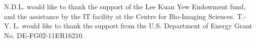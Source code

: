 \documentclass[]{iucr}              %
\begin{document}
N.D.L. would like to thank the support of the Lee Kuan Yew Endowment fund, and the assistance by the IT facility at the Centre for Bio-Imaging Sciences. T.-Y. L. would like to thank the support from the U.S. Department of Energy Grant No. DE-FG02-11ER16210.





\end{document}
